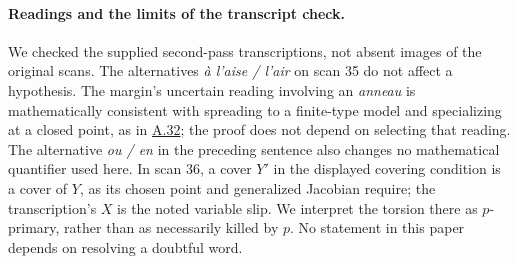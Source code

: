 \documentclass[11pt,a4paper]{article}
\newcommand{\statementref}[1]{\hyperlink{#1}{#1}}
\begin{document}
\paragraph{Readings and the limits of the transcript check.}
We checked the supplied second-pass transcriptions, not absent
images of the original scans. The alternatives
\emph{à l'aise / l'air} on scan 35 do not affect a hypothesis.
The margin's uncertain reading involving an \emph{anneau} is
mathematically consistent with spreading to a finite-type model
and specializing at a closed point, as in \statementref{A.32};
the proof does not depend on selecting that reading. The
alternative \emph{ou / en} in the preceding sentence also changes
no mathematical quantifier used here. In scan 36, a cover $Y'$
in the displayed covering condition is a cover of $Y$, as its
chosen point and generalized Jacobian require; the transcription's
$X$ is the noted variable slip. We interpret the torsion there
as $p$-primary, rather than as necessarily killed by $p$.
No statement in this paper depends on resolving a doubtful word.
\end{document}
